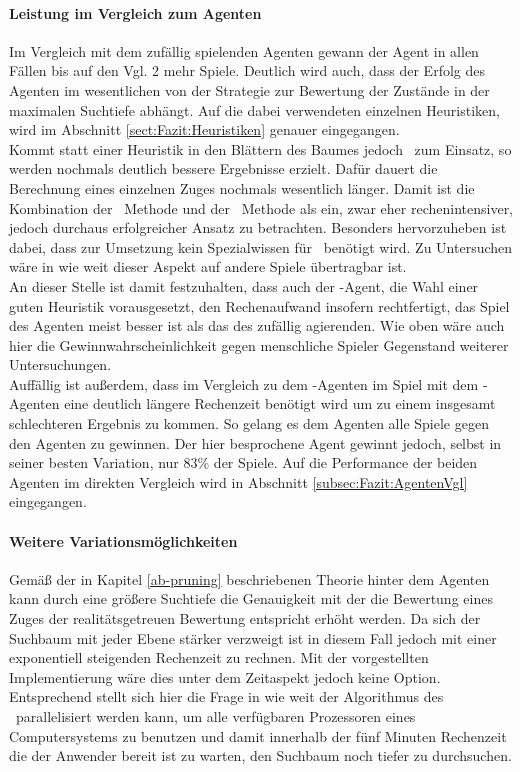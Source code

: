 \paragraph{Leistung im Vergleich zum Agenten }
Im Vergleich mit dem zufällig spielenden Agenten gewann der Agent \mxZitat{\abp} in allen Fällen bis auf den Vgl. 2 mehr Spiele. Deutlich wird auch, dass der Erfolg des Agenten im wesentlichen von der Strategie zur Bewertung der Zustände in der maximalen Suchtiefe abhängt. Auf die dabei verwendeten einzelnen Heuristiken, wird im Abschnitt \ref{sect:Fazit:Heuristiken} genauer eingegangen.
\\Kommt statt einer Heuristik in den Blättern des Baumes jedoch \mc\ zum Einsatz, so werden nochmals deutlich bessere Ergebnisse erzielt. Dafür dauert die Berechnung eines einzelnen Zuges nochmals wesentlich länger. Damit ist die Kombination der \ababs\ Methode und der \mc\ Methode als ein, zwar eher rechenintensiver, jedoch durchaus erfolgreicher Ansatz zu betrachten. Besonders hervorzuheben ist dabei, dass zur Umsetzung kein Spezialwissen für \ot\ benötigt wird. Zu Untersuchen wäre in wie weit dieser Aspekt auf andere Spiele übertragbar ist.
\\An dieser Stelle ist damit festzuhalten, dass auch der \mxZitat{\abp}-Agent, die Wahl einer guten Heuristik vorausgesetzt, den Rechenaufwand insofern rechtfertigt, das Spiel des Agenten meist besser ist als das des zufällig agierenden. Wie oben wäre auch hier die Gewinnwahrscheinlichkeit gegen menschliche Spieler Gegenstand weiterer Untersuchungen.
\\Auffällig ist außerdem, dass im Vergleich zu dem \mxZitat{\mc}-Agenten im Spiel mit dem -Agenten eine deutlich längere Rechenzeit benötigt wird um zu einem insgesamt schlechteren Ergebnis zu kommen. So gelang es dem Agenten \mxZitat{\mc} alle Spiele gegen den Agenten  zu gewinnen. Der hier besprochene Agent gewinnt jedoch, selbst in seiner besten Variation, nur $83\%$ der Spiele. Auf die Performance der beiden Agenten im direkten Vergleich wird in Abschnitt \ref{subsec:Fazit:AgentenVgl} eingegangen.
\paragraph{Weitere Variationsmöglichkeiten}
Gemäß der in Kapitel \ref{ab-pruning} beschriebenen Theorie hinter dem Agenten \mxZitat{\abp} kann durch eine größere Suchtiefe  die Genauigkeit mit der die Bewertung eines Zuges der realitätsgetreuen Bewertung entspricht erhöht werden. Da sich der Suchbaum mit jeder Ebene stärker verzweigt ist in diesem Fall jedoch mit einer exponentiell steigenden Rechenzeit zu rechnen. Mit der vorgestellten Implementierung wäre dies unter dem Zeitaspekt jedoch keine Option. Entsprechend stellt sich hier die Frage in wie weit der Algorithmus des \ababs\ parallelisiert werden kann, um alle verfügbaren Prozessoren eines Computersystems zu benutzen und damit innerhalb der fünf Minuten Rechenzeit die der Anwender bereit ist zu warten, den Suchbaum noch tiefer zu durchsuchen.


